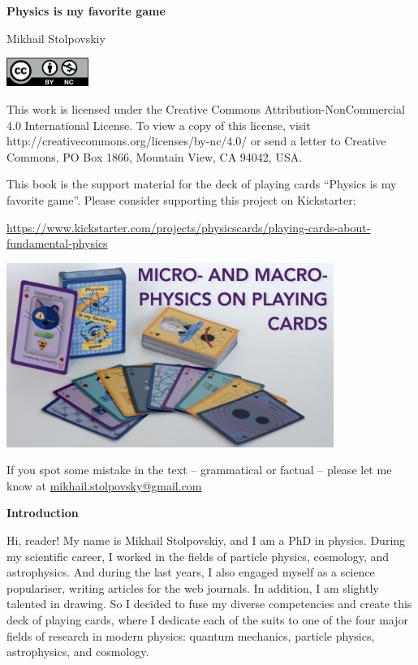 \documentclass[]{bookest}
\begin{document}
\begin{center}
{\Huge{\textbf{Physics is my favorite game}}}

\vskip10pt
Mikhail Stolpovskiy
\end{center}
\vskip200pt
\includegraphics[width=0.2\textwidth]{Pics/by-nc.png}

{\tiny{This work is licensed under the Creative Commons Attribution-NonCommercial 4.0 International License. To view a copy of this license, visit http://creativecommons.org/licenses/by-nc/4.0/ or send a letter to Creative Commons, PO Box 1866, Mountain View, CA 94042, USA.}}
\newpage

\null
\vskip100pt

This book is the support material for the deck of playing cards ``Physics is my favorite game''. Please consider supporting this project on Kickstarter:

\vskip10pt

\url{https://www.kickstarter.com/projects/physicscards/playing-cards-about-fundamental-physics}

\vskip10pt

\begin{center}
    \includegraphics[width=0.8\textwidth]{Pics/kickstarter_photo.jpeg}
\end{center}

\vskip20pt
If you spot some mistake in the text -- grammatical or factual -- please let me know at \href{mailto:mikhail.stolpovsky@gmail.com}{mikhail.stolpovsky@gmail.com} 

\newpage


{\huge{\textbf{Introduction}}}
\vskip12pt

Hi, reader! My name is Mikhail Stolpovskiy, and I am a PhD in physics. During my scientific career, I worked in the fields of particle physics, cosmology, and astrophysics. And during the last  years, I also engaged myself as a science populariser, writing articles for the web journals. In addition, I am slightly talented in drawing. So I decided to fuse  my diverse competencies and create this deck of playing cards, where I dedicate each of the suits to one of the four major fields of research in modern physics: quantum mechanics, particle physics, astrophysics, and cosmology.
\end{document}
